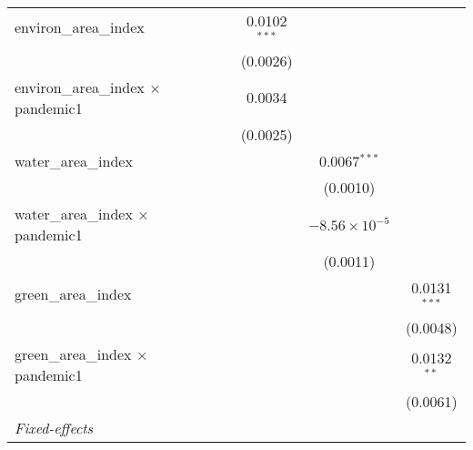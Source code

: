 \begin{table}[htbp]
\begin{tabular}{lccccccc}
      environ\_area\_index                       &                &                &                &                & 0.0102$^{***}$ &                        &   \\   
                                                 &                &                &                &                & (0.0026)       &                        &   \\   
      environ\_area\_index $\times$ pandemic1    &                &                &                &                & 0.0034         &                        &   \\   
                                                 &                &                &                &                & (0.0025)       &                        &   \\   
      water\_area\_index                         &                &                &                &                &                & 0.0067$^{***}$         &   \\   
                                                 &                &                &                &                &                & (0.0010)               &   \\   
      water\_area\_index $\times$ pandemic1      &                &                &                &                &                & $-8.56\times 10^{-5}$  &   \\   
                                                 &                &                &                &                &                & (0.0011)               &   \\   
      green\_area\_index                         &                &                &                &                &                &                        & 0.0131$^{***}$\\   
                                                 &                &                &                &                &                &                        & (0.0048)\\   
      green\_area\_index $\times$ pandemic1      &                &                &                &                &                &                        & 0.0132$^{**}$\\   
                                                 &                &                &                &                &                &                        & (0.0061)\\   
      \midrule
      \emph{Fixed-effects}\\

\end{tabular}
\end{table}
